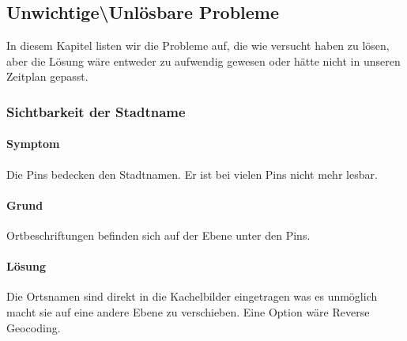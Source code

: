     \subsection*{Unwichtige\textbackslash Unlösbare Probleme}

      In diesem Kapitel listen wir die Probleme auf, die wie versucht haben zu lösen, aber die Lösung wäre entweder zu aufwendig gewesen oder hätte nicht in unseren Zeitplan gepasst.


    \subsubsection*{Sichtbarkeit der Stadtname}
      \paragraph{Symptom}
      Die Pins bedecken den Stadtnamen. Er ist bei vielen Pins nicht mehr lesbar.

      \paragraph{Grund}
      Ortbeschriftungen befinden sich auf der Ebene unter den Pins. 

      \paragraph{Lösung}
      Die Ortsnamen sind direkt in die Kachelbilder eingetragen was es unmöglich macht sie 
      auf eine andere Ebene zu verschieben. Eine Option wäre Reverse Geocoding.